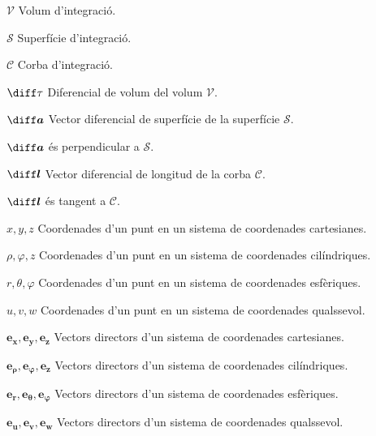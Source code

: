\documentclass[catalan,a4paper,twoside,11pt]{article}
\begin{document}
\begin{list}{}
{\setlength{\labelwidth}{20mm}
\setlength{\leftmargin}{25mm}\setlength{\labelsep}{5mm}}
   \item[$\mathscr{V}$] Volum d'integració.

   \item[$\mathscr{S}$] Superfície d'integració.

   \item[$\mathscr{C}$] Corba d'integració.

   \item[$\diff\tau$] Diferencial de volum del volum $\mathscr{V}$.

   \item[$\boldsymbol{\diff a}$] Vector diferencial de superfície de la superfície $\mathscr{S}$.

   $\boldsymbol{\diff a}$ és perpendicular a $\mathscr{S}$.

   \item[$\boldsymbol{\diff l}$] Vector diferencial de longitud de la corba
   $\mathscr{C}$.

   $\boldsymbol{\diff l}$ és tangent a $\mathscr{C}$.

   \item[$x,y,z$] Coordenades d'un punt en un sistema de coordenades cartesianes.

   \item[$\rho,\varphi,z$] Coordenades d'un punt en un sistema de   coordenades cilíndriques.

   \item[$r,\theta,\varphi$] Coordenades d'un punt en un sistema de   coordenades esfèriques.

   \item[$u,v,w$] Coordenades d'un punt en un sistema de   coordenades qualssevol.
   \item[$\boldsymbol{e_x},\boldsymbol{e_y},\boldsymbol{e_z}$]
   Vectors directors d'un sistema de  coordenades    cartesianes.

   \item[$\boldsymbol{e_\rho},\boldsymbol{e_\varphi},\boldsymbol{e_z}$] Vectors directors d'un sistema de   coordenades cilíndriques.

   \item[$\boldsymbol{e_r},\boldsymbol{e_\theta},\boldsymbol{e_\varphi}$] Vectors directors d'un sistema de   coordenades esfèriques.

   \item[$\boldsymbol{e_u},\boldsymbol{e_v},\boldsymbol{e_w}$]
   Vectors directors d'un sistema de  coordenades   qualssevol.


\end{list}
\end{document}

